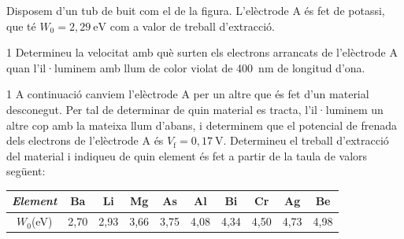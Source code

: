 Disposem d'un tub de buit com el de la figura. L'elèctrode A és fet de potassi, que té $W_0 = 2,29\ \mathrm{eV}$ com a valor de treball d'extracció.

\begin{apartat}{1}
Determineu la velocitat amb què surten els electrons arrancats de l'elèctrode A quan l'il·luminem amb llum de color violat de 400~nm de longitud d'ona.
\end{apartat}


\begin{apartat}{1}
A continuació canviem l'elèctrode A per un altre que és fet d'un material desconegut. Per tal de determinar de quin material es tracta, l'il·luminem un altre cop amb la mateixa llum d'abans, i determinem que el potencial de frenada dels electrons de l'elèctrode A és $V_\mathrm{f} = 0,17\ \mathrm{V}$. Determineu el treball d'extracció del material i indiqueu de quin element és fet a partir de la taula de valors següent:

\begin{center}
\begin{tabular}{|c|c|c|c|c|c|c|c|c|c|}
\hline
\textit{Element} & Ba & Li & Mg & As & Al & Bi & Cr & Ag & Be\\
\hline
$W_0$(eV) & 2,70 & 2,93 & 3,66 & 3,75 & 4,08 & 4,34 & 4,50 & 4,73 & 4,98\\
\hline
\end{tabular}
\end{center}
\end{apartat}

